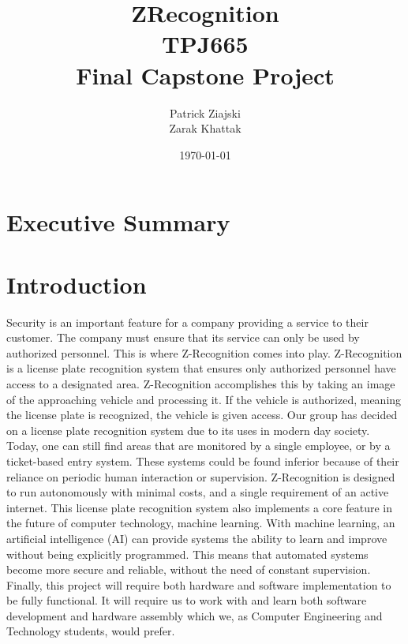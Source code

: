 \documentclass[a4paper,12pt]{article}
\title{ZRecognition \\ TPJ665 \\ Final Capstone Project}
\author{Patrick Ziajski \\ Zarak Khattak}
\date{\today}
\begin{document}
\maketitle
\thispagestyle{empty}

\newpage
\tableofcontents

\newpage
{}
\section{Executive Summary}

\newpage
\section{Introduction}
Security is an important feature for a company providing a service to their customer. The company must ensure that its service can only be used by authorized personnel. This is where Z-Recognition comes into play. Z-Recognition is a license plate recognition system that ensures only authorized personnel have access to a designated area. Z-Recognition accomplishes this by taking an image of the approaching vehicle and processing it. If the vehicle is authorized, meaning the license plate is recognized, the vehicle is given access. Our group has decided on a license plate recognition system due to its uses in modern day society. Today, one can still find areas that are monitored by a single employee, or by a ticket-based entry system. These systems could be found inferior because of their reliance on periodic human interaction or supervision. Z-Recognition is designed to run autonomously with minimal costs, and a single requirement of an active internet. This license plate recognition system also implements a core feature in the future of computer technology, machine learning. With machine learning, an artificial intelligence (AI) can provide systems the ability to learn and improve without being explicitly programmed. This means that automated systems become more secure and reliable, without the need of constant supervision. Finally, this project will require both hardware and software implementation to be fully functional. It will require us to work with and learn both software development and hardware assembly which we, as Computer Engineering and Technology students, would prefer.

\newpage
\end{document}
